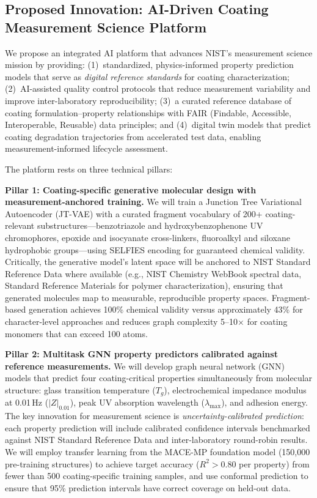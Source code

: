 \documentclass[11pt,letterpaper]{article}
\begin{document}
\subsection{Proposed Innovation: AI-Driven Coating Measurement Science Platform}

We propose an integrated AI platform that advances NIST's measurement science mission by providing: (1)~standardized, physics-informed property prediction models that serve as \textit{digital reference standards} for coating characterization; (2)~AI-assisted quality control protocols that reduce measurement variability and improve inter-laboratory reproducibility; (3)~a curated reference database of coating formulation--property relationships with FAIR (Findable, Accessible, Interoperable, Reusable) data principles; and (4)~digital twin models that predict coating degradation trajectories from accelerated test data, enabling measurement-informed lifecycle assessment.

The platform rests on three technical pillars:

\textbf{Pillar 1: Coating-specific generative molecular design with measurement-anchored training.}
We will train a Junction Tree Variational Autoencoder (JT-VAE) with a curated fragment vocabulary of 200+ coating-relevant substructures---benzotriazole and hydroxybenzophenone UV chromophores, epoxide and isocyanate cross-linkers, fluoroalkyl and siloxane hydrophobic groups---using SELFIES encoding for guaranteed chemical validity. Critically, the generative model's latent space will be anchored to NIST Standard Reference Data where available (e.g., NIST Chemistry WebBook spectral data, Standard Reference Materials for polymer characterization), ensuring that generated molecules map to measurable, reproducible property spaces. Fragment-based generation achieves 100\% chemical validity versus approximately 43\% for character-level approaches and reduces graph complexity 5--10$\times$ for coating monomers that can exceed 100 atoms.

\textbf{Pillar 2: Multitask GNN property predictors calibrated against reference measurements.}
We will develop graph neural network (GNN) models that predict four coating-critical properties simultaneously from molecular structure: glass transition temperature ($T_g$), electrochemical impedance modulus at 0.01\,Hz ($|Z|_{0.01}$), peak UV absorption wavelength ($\lambda_{\max}$), and adhesion energy. The key innovation for measurement science is \textit{uncertainty-calibrated prediction}: each property prediction will include calibrated confidence intervals benchmarked against NIST Standard Reference Data and inter-laboratory round-robin results. We will employ transfer learning from the MACE-MP foundation model (150,000 pre-training structures) to achieve target accuracy ($R^2 > 0.80$ per property) from fewer than 500 coating-specific training samples, and use conformal prediction to ensure that 95\% prediction intervals have correct coverage on held-out data.
\end{document}
